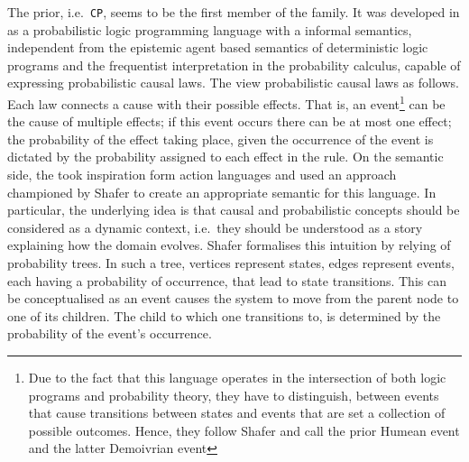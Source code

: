 \documentclass[11pt,a4paper]{book}
\theoremstyle{definition}
\theoremstyle{definition}
\theoremstyle{definition}
\theoremstyle{remark}
\newcommand{\cp}{\texttt{CP}}
\begin{document}
The prior, i.e.\ \cp, seems to be the first member of the family. It was developed in \parencite{vennekens2009cp} as a probabilistic logic programming language with a informal semantics, independent from the epistemic agent based semantics of deterministic logic programs and the frequentist interpretation in the probability calculus, capable of expressing probabilistic causal laws. 
The view probabilistic causal laws as follows. Each law connects a cause with their possible effects. That is, an event\footnote{Due to the fact that this language operates in the intersection of both logic programs and probability theory, they have to distinguish, between events that cause transitions between states and events that are set a collection of possible outcomes. Hence, they follow Shafer and call the prior Humean event and the latter Demoivrian event} can be the cause of multiple effects; if this event occurs there can be at most one effect; the probability of the effect taking place, given the occurrence of the event is dictated by the probability assigned to each effect in the rule.
On the semantic side, the took inspiration form action languages and used an approach championed by Shafer to create an appropriate semantic for this language.
In particular, the underlying idea is that causal and probabilistic concepts should be considered as a dynamic context, i.e.\ they should be understood as a story explaining how the domain evolves. 
Shafer formalises this intuition by relying of probability trees. In such a tree, vertices represent states, edges represent events, each having a probability of occurrence, that lead to state transitions. This can be conceptualised as an event causes the system to move from the parent node to one of its children. The child to which one transitions to, is determined by the probability of the event's occurrence.







\end{document}
